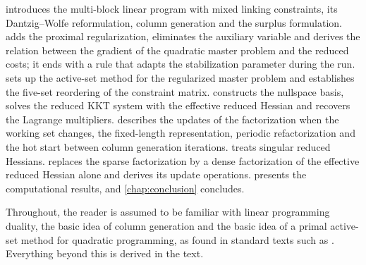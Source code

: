  introduces the multi-block linear program with mixed linking
constraints, its Dantzig--Wolfe reformulation, column generation and the surplus
formulation.  adds the proximal regularization, eliminates the
auxiliary variable and derives the relation between the gradient of the quadratic master
problem and the reduced costs; it ends with a rule that adapts the stabilization parameter
during the run.  sets up the active-set method for the
regularized master problem and establishes the five-set reordering of the constraint matrix.
 constructs the nullspace basis, solves the reduced KKT system with the
effective reduced Hessian and recovers the Lagrange multipliers. 
describes the updates of the factorization when the working set changes, the fixed-length
representation, periodic refactorization and the hot start between column generation
iterations.  treats singular reduced Hessians. 
replaces the sparse factorization by a dense factorization of the effective reduced Hessian
alone and derives its update operations.  presents the computational
results, and \cref{chap:conclusion} concludes.

\bigskip

Throughout, the reader is assumed to be familiar with linear programming duality, the basic
idea of column generation and the basic idea of a primal active-set method for quadratic
programming, as found in standard texts such as \cite{nocedal2006numerical, gill1981practical,
desaulniers2005column}. Everything beyond this is derived in the text.
